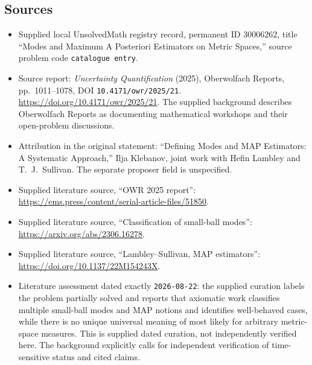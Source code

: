 \documentclass[11pt]{article}
\begin{document}
\subsection{Sources}
\begin{itemize}
\item Supplied local UnsolvedMath registry record, permanent ID \(30006262\), title ``Modes and Maximum A Posteriori Estimators on Metric Spaces,'' source problem code \texttt{catalogue entry}.
\item Source report: \emph{Uncertainty Quantification} (2025), Oberwolfach Reports, pp.~1011--1078, DOI \texttt{10.4171/owr/2025/21}. \url{https://doi.org/10.4171/owr/2025/21}. The supplied background describes Oberwolfach Reports as documenting mathematical workshops and their open-problem discussions.
\item Attribution in the original statement: ``Defining Modes and MAP Estimators: A Systematic Approach,'' Ilja Klebanov, joint work with Hefin Lambley and T.\ J.\ Sullivan. The separate proposer field is unspecified.
\item Supplied literature source, ``OWR 2025 report'': \url{https://ems.press/content/serial-article-files/51850}.
\item Supplied literature source, ``Classification of small-ball modes'': \url{https://arxiv.org/abs/2306.16278}.
\item Supplied literature source, ``Lambley--Sullivan, MAP estimators'': \url{https://doi.org/10.1137/22M154243X}.
\item Literature assessment dated exactly \texttt{2026-08-22}: the supplied curation labels the problem partially solved and reports that axiomatic work classifies multiple small-ball modes and MAP notions and identifies well-behaved cases, while there is no unique universal meaning of most likely for arbitrary metric-space measures. This is supplied dated curation, not independently verified here. The background explicitly calls for independent verification of time-sensitive status and cited claims.
\end{itemize}
\end{document}
